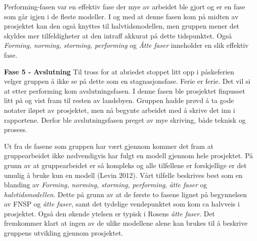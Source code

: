 \begin{adjustwidth}{2.5cm}{0cm}
Performing-fasen var en effektiv fase der mye av arbeidet ble gjort og er en fase som går igjen i de fleste modeller. 
I og med at denne fasen kom på midten av prosjektet kan den også knyttes til halvtidsmodellen, men gruppen mener det skyldes mer tilfeldigheter at den intraff akkurat på dette tidspunktet. 
Også \textit{Forming, norming, storming, performing} og \textit{Åtte faser} inneholder en slik effektiv fase. 
\vspace{\secspace}

\noindent \textbf{\Large Fase 5 - Avslutning}
Til tross for at abriedet stoppet litt opp i påskeferien velger gruppen å ikke se på dette som en stagnasjonsfase. Ferie er ferie. 
Det vil si at etter performing kom avslutningsfasen. 
I denne fasen ble prosjektet finpusset litt på og vist fram til resten av landsbyen. 
Gruppen hadde prøvd å ta gode notater iløpet av prosjektet, men nå begynte arbeidet med å skrive det inn i rapportene. 
Derfor ble avslutningsfasen preget av mye skriving, både teknisk og prosess. 
\vspace{\secspace}
\end{adjustwidth}

\vspace{\secspace}
Ut fra de fasene som gruppen har vært gjennom kommer det fram at gruppearbeidet ikke nødvendigvis har fulgt en modell gjennom hele prosjektet. 
På grunn av at gruppearbeidet er så kompleks og alle tilfellene er forskjellige er det umulig å bruke kun en modell (Levin 2012).
Vårt tilfelle beskrives best som en blanding av \textit{Forming, norming, storming, performing}, \textit{åtte faser} og \textit{halvtidsmodellen}. 
Dette på grunn av at de første to fasene lignet på begynnelsen av FNSP og \textit{åtte faser}, samt det tydelige vendepunktet som kom ca halvveis i prosjektet. 
Også den økende ytelsen er typisk i Rosens \textit{åtte faser}. 
Det fremkommer klart at ingen av de ulike modellene alene kan brukes til å beskrive gruppens utvikling gjennom prosjektet. 
